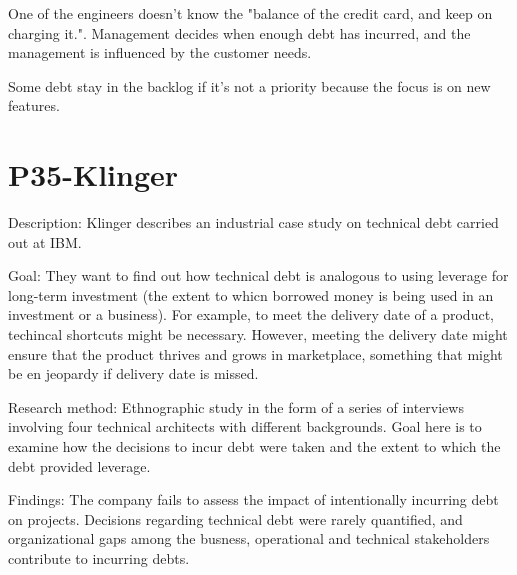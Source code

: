 One of the engineers doesn't know the "balance of the credit card, and keep on charging it.". Management decides when enough debt has incurred, and the management is influenced by the customer needs.

Some debt stay in the backlog if it's not a priority because the focus is on new features.

\section{P35-Klinger}
Description: Klinger describes an industrial case study on technical debt carried out at IBM.

Goal: They want to find out how technical debt is analogous to using leverage for long-term investment (the extent to whicn borrowed money is being used in an investment or a business). For example, to meet the delivery date of a product, techincal shortcuts might be necessary. However, meeting the delivery date might ensure that the product thrives and grows in marketplace, something that might be en jeopardy if delivery date is missed. 

Research method: Ethnographic study in the form of a series of interviews involving four technical architects with different backgrounds. Goal here is to examine how the decisions to incur debt were taken and the extent to which the debt provided leverage.

Findings: The company fails to assess the impact of intentionally incurring debt on projects. Decisions regarding technical debt were rarely quantified, and organizational gaps among the busness, operational and technical stakeholders contribute to incurring debts.

